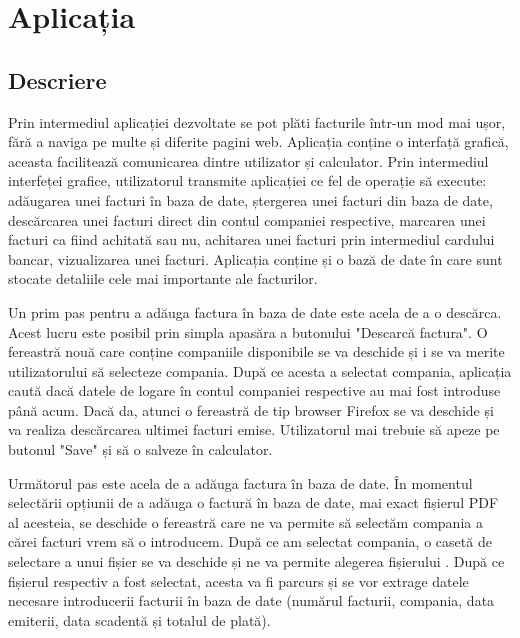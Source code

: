 \documentclass[12pt]{book}
\begin{document}
\chapter{Aplicația}
\section{Descriere}

Prin intermediul aplicației dezvoltate se pot plăti facturile într-un mod mai ușor, fără a naviga pe multe și diferite pagini web. Aplicația conține o interfață grafică, aceasta facilitează comunicarea dintre utilizator și calculator. Prin intermediul interfeței grafice, utilizatorul transmite aplicației ce fel de operație să execute: adăugarea unei facturi în baza de date, ștergerea unei facturi din baza de date, descărcarea unei facturi direct din contul companiei respective, marcarea unei facturi ca fiind achitată sau nu, achitarea unei facturi prin intermediul cardului bancar, vizualizarea unei facturi. Aplicația conține și o bază de date în care sunt stocate detaliile cele mai importante ale facturilor.

Un prim pas pentru a adăuga factura în baza de date este  acela de a o descărca. Acest lucru este posibil prin simpla apasăra a butonului "Descarcă factura". O fereastră nouă care conține companiile disponibile se va deschide și i se va merite utilizatorului să selecteze compania. După ce acesta a selectat compania, aplicația caută dacă datele de logare în contul companiei respective au mai fost introduse până acum. Dacă da, atunci o fereastră de tip browser Firefox se va deschide și va realiza descărcarea ultimei facturi emise. Utilizatorul mai trebuie să apeze pe butonul "Save" și să o salveze în calculator.

Următorul pas este acela de a adăuga factura în baza de date. În momentul selectării opțiunii de a adăuga o factură în baza de date, mai exact fișierul PDF al acesteia, se deschide o fereastră care ne va permite să selectăm compania a cărei facturi vrem să o introducem. După ce am selectat compania, o casetă de selectare a unui fișier se va deschide și ne va permite alegerea fișierului . După ce fișierul respectiv a fost selectat, acesta va fi parcurs și se vor extrage datele necesare introducerii facturii în baza de date (numărul facturii, compania, data emiterii, data scadentă și totalul de plată). 
\end{document}
